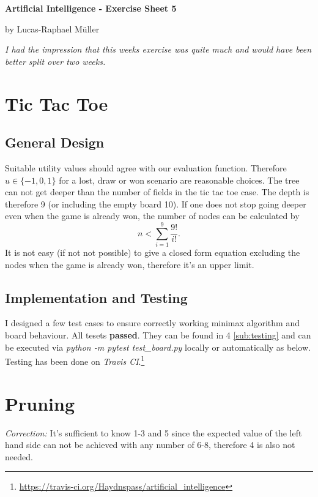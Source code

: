 \documentclass[11pt,a4paper,twoside]{article}
\begin{document}
\renewcommand\thesubsection{\alph{subsection})}

\lstset {
language = bash,
	breaklines = true,
	breakatwhitespace = true
}

\centerline{\LARGE \textbf{Artificial Intelligence - Exercise Sheet 5}}\vspace{0.5em}
\centerline{\large by Lucas-Raphael Müller}\vspace{2em}


\textit{I had the impression that this weeks exercise was quite much and would have been better split over two weeks.}
\section{Tic Tac Toe}
\subsection{General Design}
Suitable utility values should agree with our evaluation function. 
Therefore $u \in \{-1, 0, 1\}$ for a lost, draw or won scenario are reasonable choices.
The tree can not get deeper than the number of fields in the tic tac toe case.
The depth is therefore 9 (or including the empty board 10).
If one does not stop going deeper even when the game is already won, the number of nodes can be calculated by
\begin{equation}
	n < \sum\limits_{i = 1}^9 \frac{9!}{i!}.
\end{equation}
It is not easy (if not not possible) to give a closed form equation excluding the nodes when the game is already won, therefore it's an upper limit. 

\subsection{Implementation and Testing}
I designed a few test cases to ensure correctly working minimax algorithm and board behaviour.
All tesets \textbf{passed}.
They can be found in 4 \ref{sub:testing} and can be executed via \textit{python -m pytest test_board.py} locally or automatically as below.
Testing has been done on \textit{Travis CI}.\footnote{\url{https://travis-ci.org/Haydnspass/artificial_intelligence}}

\section{Pruning}
\textit{Correction:} It's sufficient to know 1-3 and 5 since the expected value of the left hand side can not be achieved with any number of 6-8, therefore 4 is also not needed.

\end{document}
